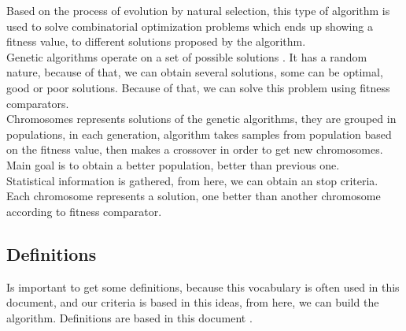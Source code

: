 \documentclass[letterpaper]{article}
\begin{document}
Based on the process of evolution by natural selection, this type of algorithm is used to solve combinatorial optimization problems which ends up showing a fitness value, to different solutions proposed by the algorithm.\\

Genetic algorithms operate on a set of possible solutions \cite{code}. It has a random nature, because of that, we can obtain several solutions, some can be optimal, good or poor solutions. Because of that, we can solve this problem using fitness comparators.\\

Chromosomes represents solutions of the genetic algorithms, they are grouped in populations, in each generation, algorithm takes samples from population based on the fitness value, then makes a crossover in order to get new chromosomes. Main goal is to obtain a better population, better than previous one.\\

Statistical information is gathered, from here, we can obtain an stop criteria. Each chromosome represents a solution, one better than another chromosome according to fitness comparator. 


\subsection{Definitions}

Is important to get some definitions, because this vocabulary is often used in this document, and our criteria is based in this ideas, from here, we can build the algorithm. Definitions are based in this document \cite{code}.
\end{document}
